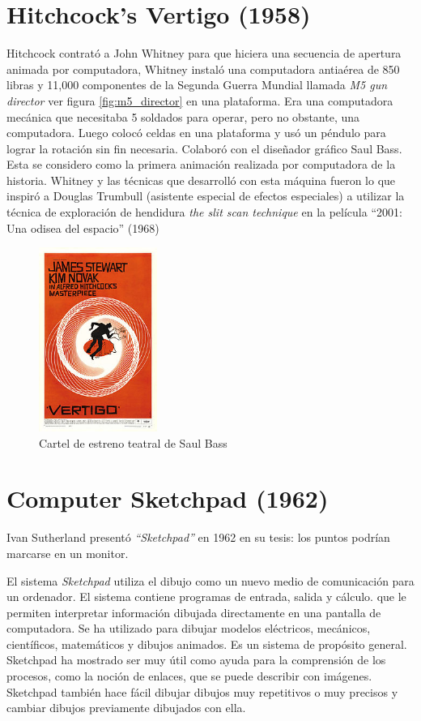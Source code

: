 \documentclass[a4paper,12pt]{report}
\begin{document}
\section{Hitchcock’s Vertigo (1958)}
Hitchcock contrató a John Whitney para que hiciera una secuencia de apertura animada por computadora, Whitney 
instaló una computadora antiaérea de 850 libras 
y 11,000 componentes de la Segunda Guerra Mundial llamada 
\textit{M5 gun director} ver figura \ref{fig:m5_director} en una plataforma.
Era una computadora mecánica que necesitaba 
5 soldados para operar, pero no obstante, una computadora. 
Luego colocó celdas en una plataforma y usó un péndulo para lograr
la rotación sin fin necesaria. 
Colaboró con el diseñador gráfico Saul Bass. 
Esta se considero como la primera animación realizada por computadora de la historia.\cite{john_whitney} 
Whitney y las técnicas que desarrolló con esta máquina fueron 
lo que inspiró a Douglas Trumbull (asistente especial de efectos especiales) a utilizar la técnica de exploración de hendidura \textit{the slit scan technique} en la película
``2001: Una odisea del espacio'' (1968)
 
 
\begin{figure}[ht]
\centering
\includegraphics[height=6cm]{Imagenes/Vertigomovie}
\caption{Cartel de estreno teatral de Saul Bass}
\label{fig:vertigo}
\end{figure}
 
 
\section{Computer Sketchpad (1962)}
Ivan Sutherland presentó \textit{``Sketchpad''} en 1962 en su tesis: los puntos podrían marcarse en un monitor.
 
El sistema \textit{Sketchpad} utiliza el dibujo como un nuevo medio de comunicación para
un ordenador. El sistema contiene programas de entrada, salida y cálculo.
que le permiten interpretar información dibujada directamente en una pantalla de computadora.
Se ha utilizado para dibujar modelos eléctricos, mecánicos, científicos, matemáticos y
dibujos animados. Es un sistema de propósito general. Sketchpad ha mostrado ser
muy útil como ayuda para la comprensión de los procesos, como la noción de enlaces, que se puede describir con imágenes. Sketchpad también hace
fácil dibujar dibujos muy repetitivos o muy precisos y cambiar
dibujos previamente dibujados con ella.\cite{sketchpad}
 
\end{document}
